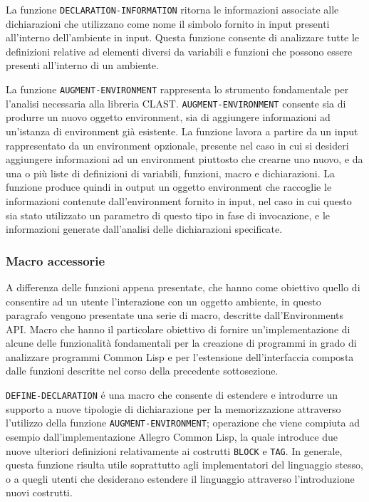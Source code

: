 La funzione \texttt{DECLARATION-INFORMATION} ritorna le informazioni associate
alle dichiarazioni che utilizzano come nome il simbolo fornito in input presenti
all’interno dell'ambiente in input. Questa funzione consente di analizzare tutte
le definizioni relative ad elementi diversi da variabili e funzioni che possono
essere presenti all’interno di un ambiente.

La funzione \texttt{AUGMENT-ENVIRONMENT} rappresenta lo strumento fondamentale
per l’analisi necessaria alla libreria CLAST. \texttt{AUGMENT-ENVIRONMENT}
consente sia di produrre un nuovo oggetto environment, sia di aggiungere
informazioni ad un'istanza di environment già esistente. La funzione lavora a
partire da un input rappresentato da un environment opzionale, presente nel
caso in cui si desideri aggiungere informazioni ad un environment piuttosto
che crearne uno nuovo, e da una o più liste di definizioni di variabili,
funzioni, macro e dichiarazioni. La funzione produce quindi in output un
oggetto environment che raccoglie le informazioni contenute dall'environment
fornito in input, nel caso in cui questo sia stato utilizzato un parametro di
questo tipo in fase di invocazione, e le informazioni generate dall'analisi
delle dichiarazioni specificate.

\subsubsection{Macro accessorie}

A differenza delle funzioni appena presentate, che hanno come obiettivo quello
di consentire ad un utente l'interazione con un oggetto ambiente, in questo
paragrafo vengono presentate una serie di macro, descritte dall'Environments
API. Macro che hanno il particolare obiettivo di fornire un'implementazione di
alcune delle funzionalità fondamentali per la creazione di programmi in grado di
analizzare programmi Common Lisp e per l'estensione dell'interfaccia composta
dalle funzioni descritte nel corso della precedente sottosezione.

\texttt{DEFINE-DECLARATION} é una macro che consente di estendere e introdurre
un supporto a nuove tipologie di dichiarazione per la memorizzazione attraverso
l'utilizzo della funzione \texttt{AUGMENT-ENVIRONMENT}; operazione che viene
compiuta ad esempio dall’implementazione Allegro Common Lisp, la quale introduce
due nuove ulteriori definizioni relativamente ai costrutti \texttt{BLOCK} e
\texttt{TAG}. In generale, questa funzione risulta utile soprattutto agli
implementatori del linguaggio stesso, o a quegli utenti che desiderano estendere
il linguaggio attraverso l'introduzione nuovi costrutti.

